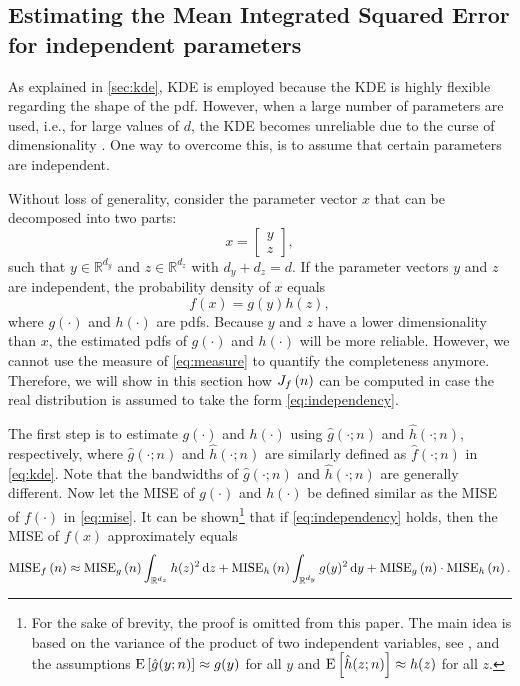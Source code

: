 \subsection{Estimating the Mean Integrated Squared Error for independent parameters}
\label{sec:mise independent}

As explained in \cref{sec:kde}, KDE is employed because the KDE is highly flexible regarding the shape of the pdf. However, when a large number of parameters are used, i.e., for large values of $d$, the KDE becomes unreliable due to the curse of dimensionality \cite{scott2015multivariate}. One way to overcome this, is to assume that certain parameters are independent. 

Without loss of generality, consider the parameter vector $x$ that can be decomposed into two parts:
\begin{equation}
	\label{eq:combine}
	x = \begin{bmatrix}
		y \\ z
	\end{bmatrix},
\end{equation}
such that $y \in \mathbb{R}^{d_y}$ and $z \in \mathbb{R}^{d_z}$ with $d_y+d_z=d$. If the parameter vectors $y$ and $z$ are independent, the probability density of $x$ equals
\begin{equation}
	\label{eq:independency}
	f(x) = g(y) h(z),
\end{equation}
where $g(\cdot)$ and $h(\cdot)$ are pdfs.
Because $y$ and $z$ have a lower dimensionality than $x$, the estimated pdfs of $g(\cdot)$ and $h(\cdot)$ will be more reliable. However, we cannot use the measure of \cref{eq:measure} to quantify the completeness anymore. Therefore, we will show in this section how $J_{f} \left( n \right)$ can be computed in case the real distribution is assumed to take the form \cref{eq:independency}.

The first step is to estimate $g(\cdot)$ and $h(\cdot)$ using $\hat{g}(\cdot;n)$ and $\hat{h}(\cdot;n)$, respectively, where $\hat{g}(\cdot;n)$ and $\hat{h}(\cdot;n)$ are similarly defined as $\hat{f}(\cdot;n)$ in \cref{eq:kde}. Note that the bandwidths of $\hat{g}(\cdot;n)$ and $\hat{h}(\cdot;n)$ are generally different. Now let the MISE of $g(\cdot)$ and $h(\cdot)$ be defined similar as the MISE of $f(\cdot)$ in \cref{eq:mise}. It can be shown\footnote{For the sake of brevity, the proof is omitted from this paper. The main idea is based on the variance of the product of two independent variables, see \textcite{goodman1960exact}, and the assumptions $\textup{E} \left[ \hat{g}(y;n) \right] \approx g(y)$ for all $y$ and $\textup{E} \left[ \hat{h}(z;n) \right] \approx h(z)$ for all $z$.} that if \cref{eq:independency} holds, then the MISE of $f(x)$ approximately equals
\begin{dmath}
	\label{eq:mise independent}
	\mise{f}{n} \approx \mise{g}{n} \int_{\mathbb{R}^{d_z}} h(z)^2 \ud z + \mise{h}{n} \int_{\mathbb{R}^{d_y}} g(y)^2 \ud y + \mise{g}{n} \cdot \mise{h}{n}.
\end{dmath}

